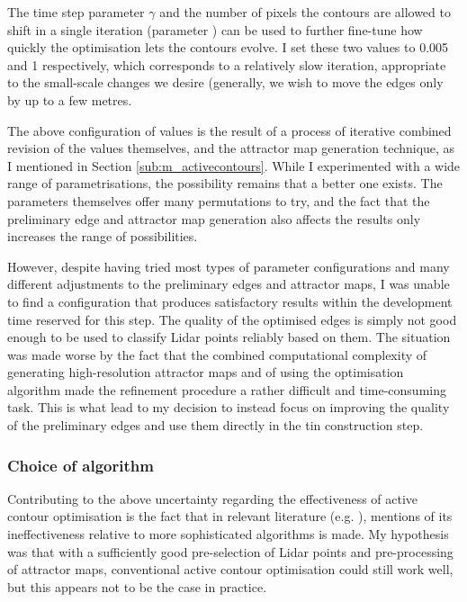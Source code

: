 The time step parameter $\gamma$ and the number of pixels the contours are allowed to shift in a single iteration (parameter ) can be used to further fine-tune how quickly the optimisation lets the contours evolve. I set these two values to 0.005 and 1 respectively, which corresponds to a relatively slow iteration, appropriate to the small-scale changes we desire (generally, we wish to move the edges only by up to a few metres.

The above configuration of values is the result of a process of iterative combined revision of the values themselves, and the attractor map generation technique, as I mentioned in Section \ref{sub:m_activecontours}. While I experimented with a wide range of parametrisations, the possibility remains that a better one exists. The parameters themselves offer many permutations to try, and the fact that the preliminary edge and attractor map generation also affects the results only increases the range of possibilities.  

However, despite having tried most types of parameter configurations and many different adjustments to the preliminary edges and attractor maps, I was unable to find a configuration that produces satisfactory results within the development time reserved for this step. The quality of the optimised edges is simply not good enough to be used to classify Lidar points reliably based on them. The situation was made worse by the fact that the combined computational complexity of generating high-resolution attractor maps and of using the optimisation algorithm made the refinement procedure a rather difficult and time-consuming task. This is what lead to my decision to instead focus on improving the quality of the preliminary edges and use them directly in the \ac{tin} construction step. 

\subsubsection{Choice of algorithm}

Contributing to the above uncertainty regarding the effectiveness of active contour optimisation is the fact that in relevant literature (e.g. \cite{boyko_funkhauser_2011}), mentions of its ineffectiveness relative to more sophisticated algorithms is made. My hypothesis was that with a sufficiently good pre-selection of Lidar points and pre-processing of attractor maps, conventional active contour optimisation could still work well, but this appears not to be the case in practice.

